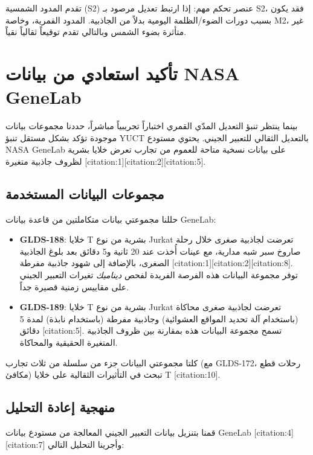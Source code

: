 \documentclass[11pt,a4paper]{article}
\theoremstyle{remark}
\begin{document}
	تقدم المدود الشمسية (S2) عنصر تحكم مهم: إذا ارتبط تعديل مرصود بـ S2، فقد يكون بسبب دورات الضوء/الظلمة اليومية بدلاً من الجاذبية. المدود القمرية، وخاصة M2، غير متأثرة بضوء الشمس وبالتالي تقدم توقيعاً ثقالياً نقياً.
	
	\section{تأكيد استعادي من بيانات NASA GeneLab}
	\label{sec:genelab}
	
	بينما ينتظر تنبؤ التعديل المدّي القمري اختباراً تجريبياً مباشراً، حددنا مجموعات بيانات موجودة تؤكد بشكل مستقل تنبؤ YUCT بالتعديل الثقالي للتعبير الجيني. يحتوي مستودع NASA GeneLab على بيانات نسخية متاحة للعموم من تجارب تعرض خلايا بشرية لظروف جاذبية متغيرة [citation:1][citation:2][citation:5].
	
	\subsection{مجموعات البيانات المستخدمة}
	
	حللنا مجموعتي بيانات متكاملتين من قاعدة بيانات GeneLab:
	
	\begin{itemize}
		\item \textbf{GLDS-188}: خلايا T بشرية من نوع Jurkat تعرضت لجاذبية صغرى خلال رحلة صاروخ سبر شبه مدارية، مع عينات أُخذت عند 20 ثانية و5 دقائق بعد بلوغ الجاذبية الصغرى، بالإضافة إلى شهود جاذبية مفرطة [citation:1][citation:2][citation:8]. توفر مجموعة البيانات هذه الفرصة الفريدة لفحص \textit{ديناميك} تغيرات التعبير الجيني على مقاييس زمنية قصيرة جداً.
		
		\item \textbf{GLDS-189}: خلايا T بشرية من نوع Jurkat تعرضت لجاذبية صغرى محاكاة (باستخدام آلة تحديد المواقع العشوائية) وجاذبية مفرطة (باستخدام نابذة) لمدة 5 دقائق [citation:5]. تسمح مجموعة البيانات هذه بمقارنة بين ظروف الجاذبية المتغيرة الحقيقية والمحاكاة.
	\end{itemize}
	
	كلتا مجموعتي البيانات جزء من سلسلة من ثلاث تجارب (مع GLDS-172، رحلات قطع مكافئ) تبحث في التأثيرات الثقالية على خلايا T [citation:10].
	
	\subsection{منهجية إعادة التحليل}
	
	قمنا بتنزيل بيانات التعبير الجيني المعالجة من مستودع بيانات GeneLab [citation:4][citation:7] وأجرينا التحليل التالي:
	
\end{document}
